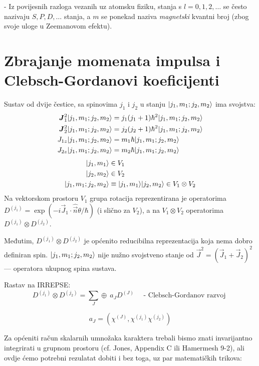 - Iz povijesnih razloga vezanih uz atomsku fiziku, stanja s $l=0,1,2,\ldots$
se često nazivaju $S, P, D,\ldots$ stanja, a $m$ se ponekad naziva
\emph{magnetski} kvantni broj (zbog svoje uloge u Zeemanovom efektu).

\section{Zbrajanje momenata impulsa i Clebsch-Gordanovi koeficijenti}

Sustav od dvije čestice, sa spinovima $j_1$ i $j_2$ u stanju 
$| j_1, m_1; j_2, m_2 \rangle$ ima svojstva:
\begin{align*}
\vec{J}_{1}^2 \ket{j_1, m_1; j_2, m_2} &= j_1(j_1+1)\hbar^2 
  \ket{j_1, m_1; j_2, m_2} \\
\vec{J}_{2}^2 \ket{j_1, m_1; j_2, m_2} &= j_2(j_2+1)\hbar^2 
  \ket{j_1, m_1; j_2, m_2} \\
J_{1z}\ket{j_1, m_1; j_2, m_2} &= m_1 \hbar \ket{j_1, m_1; j_2, m_2}\\
J_{2z}\ket{j_1, m_1; j_2, m_2} &= m_2 \hbar \ket{j_1, m_1; j_2, m_2}
\end{align*}
\begin{align*}
| j_1, m_1 \rangle &\in V_1\\
| j_2, m_2 \rangle &\in V_2\\
| j_1, m_1; j_2, m_2 \rangle&\equiv| j_1, m_1 \rangle| j_2, m_2 \rangle \in V_1\otimes V_2
\end{align*}
Na vektorskom
prostoru $V_1$ grupa rotacija reprezentirana je operatorima $D^{(j_1)}=
\exp(-i\vec{J}_1\cdot\hat{\vec{n}}\theta/\hbar)$ (i slično za $V_2$),
a na $V_1\otimes V_2$ operatorima
$D^{(j_1)}\otimes D^{(j_2)}$.

Međutim, $D^{(j_1)}\otimes D^{(j_2)}$ je općenito reducibilna reprezentacija
koja nema dobro definiran spin. $| j_1, m_1; j_2, m_2 \rangle$ nije nužno svojstveno
stanje od $\vec{J}^2 = (\vec{J}_1 + \vec{J}_2)^2$ --- operatora ukupnog spina
sustava.

Rastav na IRREPSE:
\begin{displaymath}
  D^{(j_1)}\otimes D^{(j_2)} =
  \sum_J \oplus\: a_{J}D^{(J)} \quad
   \textrm{ - Clebsch-Gordanov razvoj }
\end{displaymath}

\begin{displaymath}
a_J = \left( \chi^{(J)}, \chi^{(j_1)} \chi^{(j_2)} \right)
\end{displaymath}

Za općeniti račun skalarnih umnožaka karaktera trebali bismo
znati invarijantno integrirati u grupnom prostoru (cf. Jones,
Appendix C ili Hamermesh 9-2), ali ovdje ćemo potrebni rezulatat
dobiti i bez toga, uz par matematičkih trikova:

